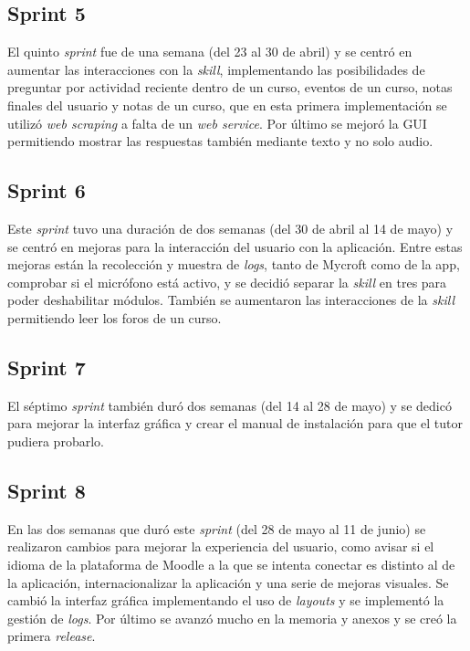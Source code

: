 \subsection{Sprint 5}

El quinto \textit{sprint} fue de una semana (del 23 al 30 de abril) y se centró en aumentar las interacciones con la \textit{skill}, implementando las posibilidades de preguntar por actividad reciente dentro de un curso, eventos de un curso, notas finales del usuario y notas de un curso, que en esta primera implementación se utilizó \textit{web scraping} a falta de un \textit{web service}. Por último se mejoró la GUI permitiendo mostrar las respuestas también mediante texto y no solo audio.

\subsection{Sprint 6}

Este \textit{sprint} tuvo una duración de dos semanas (del 30 de abril al 14 de mayo) y se centró en mejoras para la interacción del usuario con la aplicación. Entre estas mejoras están la recolección y muestra de \textit{logs}, tanto de Mycroft como de la app, comprobar si el micrófono está activo, y se decidió separar la \textit{skill} en tres para poder deshabilitar módulos. También se aumentaron las interacciones de la \textit{skill} permitiendo leer los foros de un curso.

\subsection{Sprint 7}

El séptimo \textit{sprint} también duró dos semanas (del 14 al 28 de mayo) y se dedicó para mejorar la interfaz gráfica y crear el manual de instalación para que el tutor pudiera probarlo.

\subsection{Sprint 8}

En las dos semanas que duró este \textit{sprint} (del 28 de mayo al 11 de junio) se realizaron cambios para mejorar la experiencia del usuario, como avisar si el idioma de la plataforma de Moodle a la que se intenta conectar es distinto al de la aplicación, internacionalizar la aplicación y una serie de mejoras visuales. Se cambió la interfaz gráfica implementando el uso de \textit{layouts} y se implementó la gestión de \textit{logs}. Por último se avanzó mucho en la memoria y anexos y se creó la primera \textit{release}.


